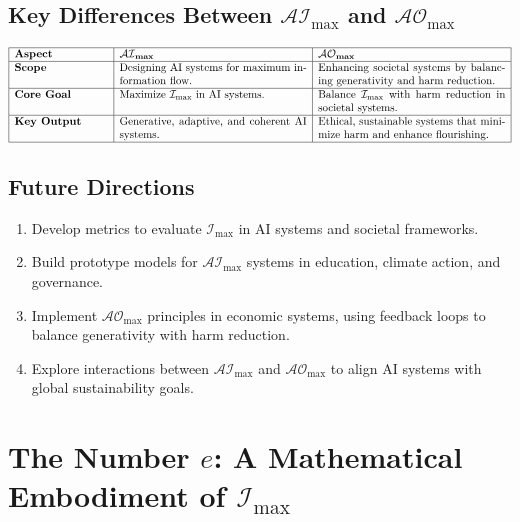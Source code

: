 \documentclass[12pt]{article}
\begin{document}
\subsection{Key Differences Between \( \mathcal{AI}_{\text{max}} \) and \( \mathcal{AO}_{\text{max}} \)}

\[
\begin{array}{|p{3cm}|p{6cm}|p{6cm}|}
\hline
\textbf{Aspect} & \textbf{\( \mathcal{AI}_{\text{max}} \)} & \textbf{\( \mathcal{AO}_{\text{max}} \)} \\
\hline
\textbf{Scope} & Designing AI systems for maximum information flow. & Enhancing societal systems by balancing generativity and harm reduction. \\
\hline
\textbf{Core Goal} & Maximize \( \mathcal{I}_{\text{max}} \) in AI systems. & Balance \( \mathcal{I}_{\text{max}} \) with harm reduction in societal systems. \\
\hline
\textbf{Key Output} & Generative, adaptive, and coherent AI systems. & Ethical, sustainable systems that minimize harm and enhance flourishing. \\
\hline
\end{array}
\]

\subsection{Future Directions}
\begin{enumerate}
    \item Develop metrics to evaluate \( \mathcal{I}_{\text{max}} \) in AI systems and societal frameworks.
    \item Build prototype models for \( \mathcal{AI}_{\text{max}} \) systems in education, climate action, and governance.
    \item Implement \( \mathcal{AO}_{\text{max}} \) principles in economic systems, using feedback loops to balance generativity with harm reduction.
    \item Explore interactions between \( \mathcal{AI}_{\text{max}} \) and \( \mathcal{AO}_{\text{max}} \) to align AI systems with global sustainability goals.
\end{enumerate}




\section{The Number \(e\): A Mathematical Embodiment of \(\mathcal{I}_{\text{max}}\)}
\end{document}
